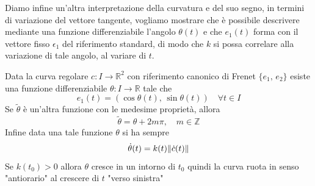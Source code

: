         \newpage 
        Diamo infine un'altra interpretazione della curvatura e del suo segno, in termini di variazione del vettore tangente, vogliamo mostrare che è 
        possibile descrivere mediante una funzione differenziabile l'angolo $\theta (t)$ e che $e_1(t)$ forma con il vettore fisso $\epsilon_1$
        del riferimento standard, di modo che $k$ si possa correlare alla variazione di tale angolo, al variare di $t$.
        \begin{proposizione}
        \label{prop:curva_piana_riferimento_canonico_di_frenet_con_angolo}
        Data la curva regolare $c \colon I \to \mathbb{R}^2$ con riferimento canonico di Frenet $\{e_1, \, e_2\}$ esiste una funzione differenziabile 
        $\theta \colon I \to \mathbb{R}$ tale che 
        \begin{equation}
        \label{eq:curvatura_piana_in_funzione_angolo_1}
        e_1(t) = \left( \cos \theta(t), \, \sin \theta(t) \right) \quad \forall t \in I
        \end{equation}
        Se $\tilde{\theta}$ è un'altra funzione con le medesime proprietà, allora 
        \begin{equation}
        \tilde{\theta} = \theta + 2m\pi, \quad m \in \mathbb{Z}
        \end{equation}
        Infine data una tale funzione $\theta$ si ha sempre 
        \begin{equation}
        \label{eq:curvatura_piana_in_funzione_angolo_3}
        \dot{\theta}(t) = k(t) \lVert\dot{c}(t)\rVert
        \end{equation}
        \textcolor{blu}{Se $k(t_0)>0$ allora $\theta$ cresce in un intorno di $t_0$ quindi la curva ruota in senso "antiorario" 
        al crescere di $t$ "verso sinistra"}
        \end{proposizione}
